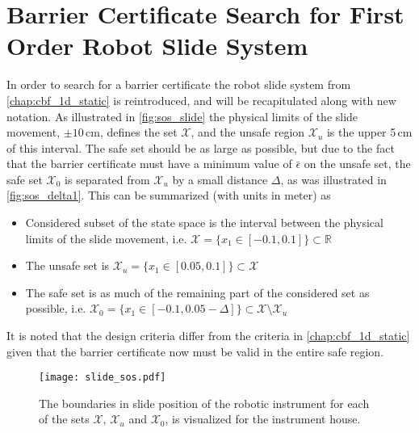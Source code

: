 
\section{Barrier Certificate Search for First Order Robot Slide System}\label{sec:sos_search_1storder}
In order to search for a barrier certificate the robot slide system from \autoref{chap:cbf_1d_static} is reintroduced, and will be recapitulated along with new notation. As illustrated in \autoref{fig:sos_slide} the physical limits of the slide movement, $\pm 10$\,cm,  defines the set $\mathcal{X}$, and the unsafe region $\mathcal{X}_u$ is the upper 5\,cm of this interval. The safe set should be as large as possible, but due to the fact that the barrier certificate must have a minimum value of $\bar{\epsilon}$ on the unsafe set, the safe set $\mathcal{X}_0$ is separated from $\mathcal{X}_u$ by a small distance $\Delta$, as was illustrated in \autoref{fig:sos_delta1}. This can be summarized  (with units in meter) as
\vspace{-2mm}
\begin{itemize}
\itemsep-0.7mm
\item Considered subset of the state space is the interval between the physical limits of the slide movement, i.e. $\mathcal{X}=\{x_1\in [-0.1,0.1] \}\subset\mathbb{R}$
\item The unsafe set is $\mathcal{X}_u=\{x_1\in [0.05,0.1] \}\subset\mathcal{X}$
\item The safe set is as much of the remaining part of the considered set as possible, i.e. $\mathcal{X}_0=\{x_1\in [-0.1,0.05-\Delta] \}\subset\mathcal{X}\setminus\mathcal{X}_u$
\end{itemize}
It is noted that the design criteria differ from the criteria in \autoref{chap:cbf_1d_static} given that the barrier certificate now must be valid in the entire safe region.

\vspace{-2mm}
\begin{figure}[H]
	\centering\hspace{10mm}
\texttt{[image: slide\_sos.pdf]}
\caption{The boundaries in slide position of the robotic instrument for each of the sets $\mathcal{X}$, $\mathcal{X}_u$ and $\mathcal{X}_0$,  is visualized for the instrument house.}
	\label{fig:sos_slide}
\end{figure}

